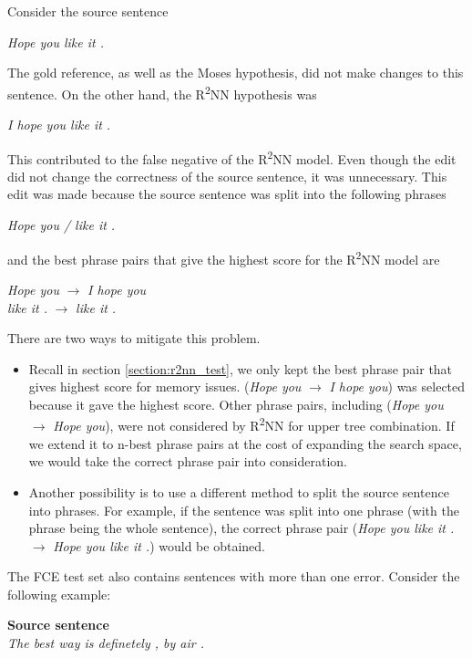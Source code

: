 \documentclass[12pt,a4paper,twoside,openright]{report}
\begin{document}
Consider the source sentence
\begin{center}
    \textit{Hope you like it .}
\end{center}
The gold reference, as well as the Moses hypothesis, did not make changes to this sentence. On the other hand, the R\textsuperscript{2}NN hypothesis was
\begin{center}
\textit{I hope you like it .}
\end{center}
This contributed to the false negative of the R\textsuperscript{2}NN model. Even though the edit did not change the correctness of the source sentence, it was unnecessary. This edit was made because the source sentence was split into the following phrases
\begin{center}
\textit{Hope you / like it .}
\end{center}
and the best phrase pairs that give the highest score for the R\textsuperscript{2}NN model are
\begin{center}
\textit{Hope you} $\rightarrow$ \textit{I hope you}\\
\textit{like it .} $\rightarrow$ \textit{like it .}
\end{center}

There are two ways to mitigate this problem.
\begin{itemize}
    \item Recall in section \ref{section:r2nn_test}, we only kept the best phrase pair that gives highest score for memory issues. (\textit{Hope you} $\rightarrow$ \textit{I hope you}) was selected because it gave the highest score. Other phrase pairs, including (\textit{Hope you} $\rightarrow$ \textit{Hope you}), were not considered by R\textsuperscript{2}NN for upper tree combination. If we extend it to n-best phrase pairs at the cost of expanding the search space, we would take the correct phrase pair into consideration.
    \item Another possibility is to use a different method to split the source sentence into phrases. For example, if the sentence was split into one phrase (with the phrase being the whole sentence), the correct phrase pair (\textit{Hope you like it .} $\rightarrow$ \textit{Hope you like it .}) would be obtained.
\end{itemize}

The FCE test set also contains sentences with more than one error. Consider the following example:

\textbf{Source sentence}\\
\textit{The best way is definetely , by air .}
\end{document}
